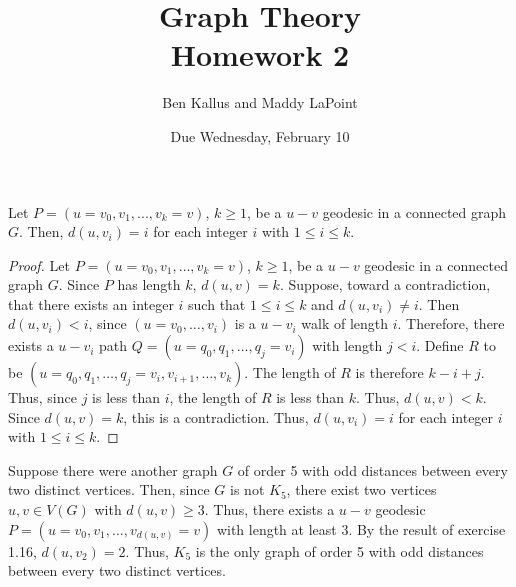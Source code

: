 \documentclass[12pt]{article}
\title{Graph Theory \\ Homework 2}
\author{Ben Kallus and Maddy LaPoint}
\date{Due Wednesday, February 10}
\begin{document}
\pagecolor{black}
\color{white}
\maketitle


 Let $P = (u=v_0,v_1,...,v_k=v)$, $k\geq 1$, be a $u - v$ geodesic in a connected graph $G$. Then, $d(u,v_i) = i$ for each integer $i$ with $1 \leq i \leq k$.
\begin{proof}
    Let $P = (u = v_0, v_1, \hdots, v_k = v)$, $k \geq 1$, be a $u-v$ geodesic in a connected graph $G$.
    Since $P$ has length $k$, $d(u,v)=k$.
    Suppose, toward a contradiction, that there exists an integer $i$ such that $1 \leq i \leq k$ and $d(u,v_i) \neq i$.
    Then $d(u,v_i) < i$, since $(u = v_0, \hdots, v_i)$ is a $u-v_i$ walk of length $i$.
    Therefore, there exists a $u-v_i$ path $Q = (u=q_0, q_1, \hdots, q_j=v_i)$ with length $j < i$.
    Define $R$ to be $(u=q_0, q_1, \hdots, q_j=v_i, v_{i+1}, \hdots, v_k)$.
    The length of $R$ is therefore $k - i + j$.
    Thus, since $j$ is less than $i$, the length of $R$ is less than $k$.
    Thus, $d(u,v) < k$. Since $d(u,v) = k$, this is a contradiction.
    Thus, $d(u,v_i)=i$ for each integer $i$ with $1 \leq i \leq k$.
\end{proof}

\bigskip
{}
\begin{center}
\end{center}

    Suppose there were another graph $G$ of order 5 with odd distances between every two distinct vertices.
    Then, since $G$ is not $K_5$, there exist two vertices $u,v \in V(G)$ with $d(u,v) \geq 3$.
    Thus, there exists a $u-v$ geodesic $P = (u=v_0, v_1, \hdots, v_{d(u,v)}=v)$ with length at least 3.
    By the result of exercise 1.16, $d(u,v_2) = 2$.
    Thus, $K_5$ is the only graph of order 5 with odd distances between every two distinct vertices.
\end{document}
